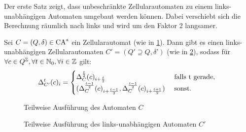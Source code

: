 Der erste Satz zeigt, dass unbeschränkte Zellularautomaten zu einem links-unabhängigen Automaten
umgebaut werden können. Dabei verschiebt sich die Berechnung räumlich nach links und wird um den Faktor 2 langsamer.
\begin{satz}
    \label{zellautoZuLinksunabhaengig}
    Sei $C = (Q, \delta) \in \textrm{CA}^*$ ein Zellularautomat (wie in \cref{fig:NormalZuRechtsUnabh}).
    Dann gibt es einen links-unabhängigen Zellularautomaten $C' = (Q' \supseteq Q, \delta')$ (wie in \cref{fig:NormalZuRechtsUnabh2}),
    sodass
    für $\forall c \in Q^{\mathbb{Z}}, \forall t \in \mathbb{N}_0, \forall i \in \mathbb{Z}$ gilt:
    \[
            \Delta_{C'}^{t}(c)_i =
            \begin{cases}
                \Delta_C^{\frac{t}{2}}(c)_{i+\frac{t}{2}} & \text{ falls } $t$ \text{ gerade, } \\
                (\Delta_C^{\frac{t - 1}{2}}(c)_{i+\frac{t - 1}{2}}, \Delta_C^{\frac{t-1}{2}}(c)_{i+\frac{t+1}{2}})  & \text{ sonst.}
            \end{cases}
    \]
        
    \begin{figure}[h!]
        \centering
        
        \caption{Teilweise Ausführung des Automaten $C$}
        \label{fig:NormalZuRechtsUnabh}
    \end{figure}
   \begin{figure}[h!]
        \centering
        
        \caption{Teilweise Ausführung des links-unabhängigen Automaten $C'$}
        \label{fig:NormalZuRechtsUnabh2}
    \end{figure}

\end{satz}
